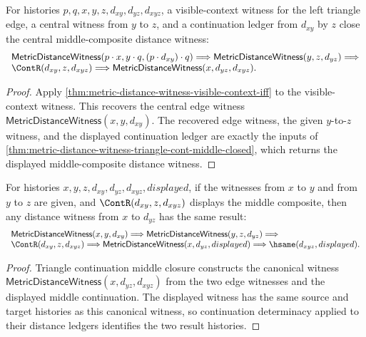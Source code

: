 \begin{theorem}
\label{thm:metric-distance-witness-visible-context-triangle-cont-middle-closed}
For histories $p,q,x,y,z,d_{xy},d_{yz},d_{xyz}$, a visible-context witness for
the left triangle edge, a central witness from $y$ to $z$, and a continuation
ledger from $d_{xy}$ by $z$ close the central middle-composite distance witness:
$$
\begin{array}{l}
\mathsf{MetricDistanceWitness}(p\cdot x,y\cdot q,(p\cdot d_{xy})\cdot q)
\Longrightarrow
\mathsf{MetricDistanceWitness}(y,z,d_{yz})\Longrightarrow
\\
\ContR(d_{xy},z,d_{xyz})\Longrightarrow
\mathsf{MetricDistanceWitness}(x,d_{yz},d_{xyz}).
\end{array}
$$
\end{theorem}
\begin{proof}
Apply \autoref{thm:metric-distance-witness-visible-context-iff} to the
visible-context witness. This recovers the central edge witness
$\mathsf{MetricDistanceWitness}(x,y,d_{xy})$. The recovered edge witness, the
given $y$-to-$z$ witness, and the displayed continuation ledger are exactly the
inputs of \autoref{thm:metric-distance-witness-triangle-cont-middle-closed},
which returns the displayed middle-composite distance witness.
\end{proof}

\begin{theorem}
\label{thm:metric-distance-witness-triangle-cont-middle-result-deterministic}
For histories $x,y,z,d_{xy},d_{yz},d_{xyz},displayed$, if the witnesses from
$x$ to $y$ and from $y$ to $z$ are given, and
$\ContR(d_{xy},z,d_{xyz})$ displays the middle composite, then any distance
witness from $x$ to $d_{yz}$ has the same result:
$$
\begin{array}{l}
\mathsf{MetricDistanceWitness}(x,y,d_{xy})\Longrightarrow
\mathsf{MetricDistanceWitness}(y,z,d_{yz})\Longrightarrow
\\
\ContR(d_{xy},z,d_{xyz})\Longrightarrow
\mathsf{MetricDistanceWitness}(x,d_{yz},displayed)\Longrightarrow
\hsame(d_{xyz},displayed).
\end{array}
$$
\end{theorem}
\begin{proof}
Triangle continuation middle closure constructs the canonical witness
$\mathsf{MetricDistanceWitness}(x,d_{yz},d_{xyz})$ from the two edge witnesses
and the displayed middle continuation. The displayed witness has the same
source and target histories as this canonical witness, so continuation
determinacy applied to their distance ledgers identifies the two result
histories.
\end{proof}


